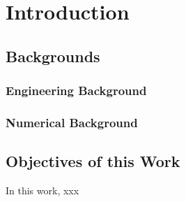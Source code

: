 \chapter{Introduction}
\label{ch:chap1}


\section{Backgrounds}

\subsection{Engineering Background}


\subsection{Numerical Background}




\section{Objectives of this Work}
In this work, xxx
